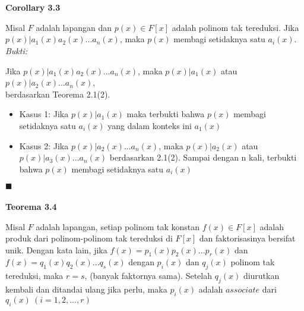 \\
\\
\textbf {Corollary 3.3}
\par Misal $F$ adalah lapangan dan $p(x) \in F[x]$ adalah polinom tak tereduksi. Jika $p(x)|a_1(x)a_2(x)...a_n(x)$, maka $p(x)$ membagi setidaknya satu $a_i(x).$
\\
	\textit{Bukti:}
\par Jika $p(x)|a_1(x)a_2(x)...a_n(x)$, maka $p(x)|a_1(x)$ atau $p(x)|a_2(x)...a_n(x)$, \\ berdasarkan Teorema 2.1(2).
	\begin{itemize}
	\item Kasus 1: Jika $p(x)|a_1(x)$ maka terbukti bahwa $p(x)$ membagi setidaknya satu $a_i(x)$ yang dalam konteks ini $a_1(x)$
	\item Kasus 2: Jika $p(x)|a_2(x)...a_n(x)$, maka $p(x)|a_2(x)$ atau $p(x)|a_3(x)...a_n(x)$ berdasarkan 2.1(2). Sampai dengan n kali, terbukti bahwa $p(x)$ membagi setidaknya satu $a_i(x)$
	\end{itemize}$\blacksquare$
\\
\\
\textbf{Teorema 3.4}
\par Misal $F$ adalah lapangan, setiap polinom tak konstan $f(x) \in F[x]$ adalah produk dari polinom-polinom tak tereduksi di $F[x]$ dan faktorisasinya bersifat unik. Dengan kata lain, jika $f(x)=p_1(x)p_2(x)...p_r(x)$ dan $f(x)=q_1(x)q_2(x)...q_s(x)$ dengan $p_i(x)$ dan $q_j(x)$ polinom tak tereduksi, maka $r=s$, (banyak faktornya sama). Setelah $q_j(x)$ diurutkan kembali dan ditandai ulang jika perlu, maka $p_i(x)$ adalah $associate$ dari $q_i(x)~(i=1,2,...,r)$
